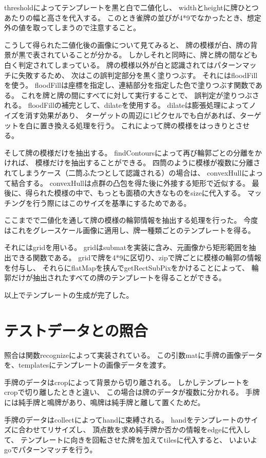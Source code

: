 \documentclass{jsarticle}
\begin{document}
\begin{multicols}{2}
thresholdによってテンプレートを黒と白で二値化し、
widthとheightに牌ひとつあたりの幅と高さを代入する。
このとき雀牌の並びが4*9でなかったとき、想定外の値を取ってしまうので注意すること。

こうして得られた二値化後の画像について見てみると、
牌の模様が白、牌の背景が黒で表されていることが分かる。
しかしそれと同時に、牌と牌の間なども白く判定されてしまっている。
牌の模様以外が白と認識されてはパターンマッチに失敗するため、
次はこの誤判定部分を黒く塗りつぶす。
それにはfloodFillを使う。
floodFillは座標を指定し、連結部分を指定した色で塗りつぶす関数である。
これを牌と牌の間にすべてに対して実行することで、
誤判定が塗りつぶされる。
floodFillの補完として、dilateを使用する。
dilateは膨張処理によってノイズを消す効果があり、
ターゲットの周辺に1ピクセルでも白があれば、ターゲットを白に置き換える処理を行う。
これによって牌の模様をはっきりとさせる。

そして牌の模様だけを抽出する。
findContoursによって再び輪郭ごとの分離をかければ、
模様だけを抽出することができる。
四筒のように模様が複数に分離されてしまうケース（二筒ふたつとして認識される）の場合は、
convexHullによって結合する。
convexHullは点群の凸包を得た後に外接する矩形で近似する。
最後に、得られた模様の中で、もっとも面積の大きなものをsizeに代入する。
マッチングを行う際にはこのサイズを基準にするためである。

ここまでで二値化を通して牌の模様の輪郭情報を抽出する処理を行った。
今度はこれをグレースケール画像に適用し、牌一種類ごとのテンプレートを得る。

それにはgridを用いる。
gridはsubmatを実装に含み、元画像から矩形範囲を抽出できる関数である。
gridで牌を4*9に区切り、zipで牌ごとに模様の輪郭の情報を付与し、
それらにflatMapを挟んでgetRectSubPixをかけることによって、
輪郭だけが抽出されたすべての牌のテンプレートを得ることができる。

以上でテンプレートの生成が完了した。

\section{テストデータとの照合}

照合は関数recognizeによって実装されている。
この引数matに手牌の画像データを、templatesにテンプレートの画像データを渡す。

手牌のデータはcropによって背景から切り離される。
しかしテンプレートをcropで切り離したときと違い、
この場合は牌のデータが複数に分かれる。
手牌には純手牌と鳴牌があり、鳴牌は純手牌と離して置くためだ。

手牌のデータはcollectによってhandに束縛される。
handをテンプレートのサイズに合わせてリサイズし、
頂点数を求め純手牌か否かの情報をedgeに代入して、
テンプレートに向きを回転させた牌を加えてtilesに代入すると、
いよいよgoでパターンマッチを行う。
	

\end{multicols}
\end{document}
